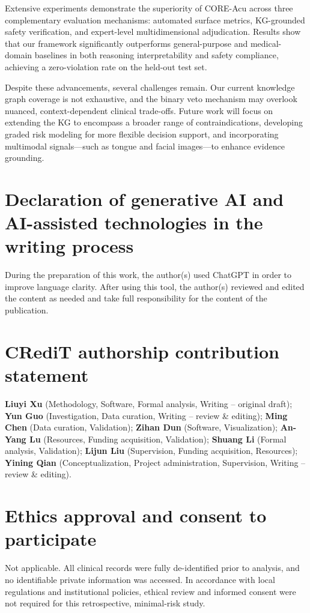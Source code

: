 \documentclass[preprint,5p,times,twocolumn,fleqn]{elsarticle}
\begin{document}
Extensive experiments demonstrate the superiority of CORE-Acu across three complementary evaluation mechanisms: automated surface metrics, KG-grounded safety verification, and expert-level multidimensional adjudication. Results show that our framework significantly outperforms general-purpose and medical-domain baselines in both reasoning interpretability and safety compliance, achieving a zero-violation rate on the held-out test set.

Despite these advancements, several challenges remain. Our current knowledge graph coverage is not exhaustive, and the binary veto mechanism may overlook nuanced, context-dependent clinical trade-offs. Future work will focus on extending the KG to encompass a broader range of contraindications, developing graded risk modeling for more flexible decision support, and incorporating multimodal signals—such as tongue and facial images—to enhance evidence grounding.

\section*{Declaration of generative AI and AI-assisted technologies in the writing process}
During the preparation of this work, the author(s) used ChatGPT in order to improve language clarity. After using this tool, the author(s) reviewed and edited the content as needed and take full responsibility for the content of the publication.

\section*{CRediT authorship contribution statement}
\textbf{Liuyi Xu} (Methodology, Software, Formal analysis, Writing -- original draft); 
\textbf{Yun Guo} (Investigation, Data curation, Writing -- review \& editing); 
\textbf{Ming Chen} (Data curation, Validation); 
\textbf{Zihan Dun} (Software, Visualization); 
\textbf{An-Yang Lu} (Resources, Funding acquisition, Validation); 
\textbf{Shuang Li} (Formal analysis, Validation); 
\textbf{Lijun Liu} (Supervision, Funding acquisition, Resources); 
\textbf{Yining Qian} (Conceptualization, Project administration, Supervision, Writing -- review \& editing).

\section*{Ethics approval and consent to participate}
Not applicable. All clinical records were fully de-identified prior to analysis, and no identifiable
private information was accessed. In accordance with local regulations and institutional policies,
ethical review and informed consent were not required for this retrospective, minimal-risk study.
\end{document}
